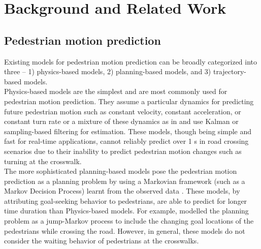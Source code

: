 \documentclass[letter,journal]{IEEEtran}
\begin{document}






\section{Background and Related Work}

\subsection{Pedestrian motion prediction}
Existing models for pedestrian motion prediction can be broadly categorized into three -- 1) physics-based models, 2) planning-based models, and 3) trajectory-based models. \\

Physics-based models are the simplest and are most commonly used for pedestrian motion prediction. They assume a particular dynamics for predicting future pedestrian motion \cite{lefevre2014survey} such as constant velocity, constant acceleration, or constant turn rate or a mixture of these dynamics as in \cite{keller2011will} and use Kalman or sampling-based filtering for estimation. These models, though being simple and fast for real-time applications, cannot reliably predict over 1 s in road crossing scenarios due to their inability to predict pedestrian motion changes such as turning at the crosswalk. \\

The more sophisticated planning-based models pose the pedestrian motion prediction as a planning problem by using a Markovian framework (such as a Markov Decision Process) learnt from the observed data \cite{karasev2016intent,kitani2012activity}. These models, by attributing goal-seeking behavior to pedestrians, are able to predict for longer time duration than Physics-based models. For example, \cite{karasev2016intent} modelled the planning problem as a jump-Markov process to include the changing goal locations of the pedestrians while crossing the road. However, in general, these models do not consider the waiting behavior of pedestrians at the crosswalks.\\
\end{document}
